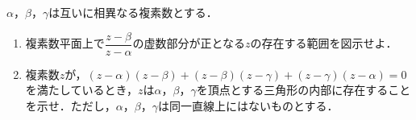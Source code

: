 $\alpha$，$\beta$，$\gamma$は互いに相異なる複素数とする．
\begin{enumerate}
  \item 複素数平面上で$\dfrac{z-\beta}{z-\alpha}$の虚数部分が正となる$z$の存在する範囲を図示せよ．
  \item 複素数$z$が，$(z-\alpha)(z-\beta)+(z-\beta)(z-\gamma)+(z-\gamma)(z-\alpha)=0$を満たしているとき，$z$は$\alpha$，$\beta$，$\gamma$を頂点とする三角形の内部に存在することを示せ．ただし，$\alpha$，$\beta$，$\gamma$は同一直線上にはないものとする．
\end{enumerate}